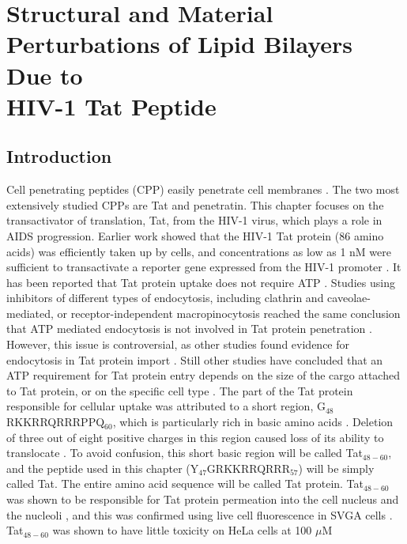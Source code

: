 \chapter{Structural and Material Perturbations of Lipid Bilayers Due to\\ HIV-1 Tat Peptide}
\section{Introduction}\label{sec:Tat_intro}
Cell penetrating peptides (\acs{CPP}) easily penetrate cell membranes 
\cite{Fischer05,Joliot04,Lindgren00}. 
The two most extensively studied CPPs are Tat and penetratin.
This chapter focuses on 
the transactivator of translation, Tat, from the HIV-1 virus, which plays a 
role in AIDS progression. 
Earlier work showed that the HIV-1 Tat 
protein (86 amino acids) was efficiently taken up by cells, and concentrations 
as low as 1 nM were sufficient to transactivate a reporter gene expressed from 
the HIV-1 promoter \cite{Frankel88,Green88}. 
It has been reported that Tat protein uptake does not 
require ATP \cite{Vives97}. 
Studies using inhibitors of different types of endocytosis, 
including clathrin and caveolae-mediated, or receptor-independent 
macropinocytosis reached the same conclusion that ATP mediated endocytosis is 
not involved in Tat protein penetration
\cite{TerAvetisyan09,Duchardt07,Tunnemann06,Ziegler05}. 
However, this issue is 
controversial, as other studies found evidence for endocytosis in Tat protein 
import \cite{Wadia04,Kaplan05,Mann91,Richard05,Jones05,Vendeville04,Foerg05,Fittipaldi05,Liu00}. 
Still other studies have concluded that an ATP requirement for 
Tat protein entry depends on the size of the cargo attached to Tat protein, or 
on the specific cell type \cite{Torchilin01,Torchilin03,Rudolph03}. 
The part of the Tat protein responsible for 
cellular uptake was attributed to a short region, G$_{48}$RKKRRQRRRPPQ$_{60}$, 
which is particularly rich in basic amino acids \cite{Vives97}. 
Deletion of three out of 
eight positive charges in this region
caused loss of its ability to translocate \cite{Vives97}. 
To avoid confusion, this short basic region will be called Tat$_{48-60}$,
and the peptide used in this chapter (Y$_{47}$GRKKRRQRRR$_{57}$)
will be simply called Tat. The entire amino acid sequence will
be called Tat protein.
Tat$_{48-60}$ was shown to be responsible for Tat
protein permeation into the cell nucleus and the nucleoli \cite{Vives97}, 
and this was confirmed using live cell fluorescence in SVGA cells \cite{Chauhan07}. 
Tat$_{48-60}$ was shown to have little toxicity on HeLa cells at 100 $\mu$M 
